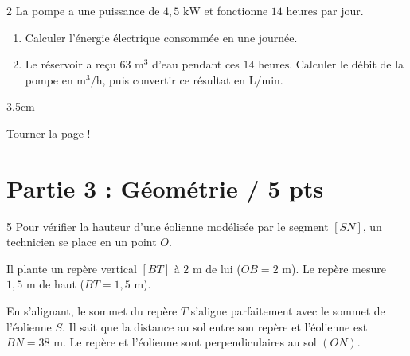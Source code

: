 \documentclass[a4paper]{book}
\begin{document}
{\begin{exerciceNote}{2}
        La pompe a une puissance de $4,5\text{ kW}$ et fonctionne $14\text{ heures}$ par jour.
        \begin{enumerate}
            \item Calculer l'énergie électrique consommée en une journée.
            \item Le réservoir a reçu $63\text{ m}^3$ d'eau pendant ces $14\text{ heures}$. Calculer le débit de la pompe en $\text{m}^3/\text{h}$, puis convertir ce résultat en $\text{L/min}$.
        \end{enumerate}
        \begin{ZoneReponse}{3.5cm}
        \end{ZoneReponse}
    \end{exerciceNote}
    

\vfill
\hfill Tourner la page !
\newpage

\section*{Partie 3 : Géométrie \points[2]/ 5 pts }

    \begin{exerciceNote}{5}
        Pour vérifier la hauteur d'une éolienne modélisée par le segment $[SN]$, un technicien se place en un point $O$. 
        
        Il plante un repère vertical $[BT]$ à $2\text{ m}$ de lui ($OB = 2\text{ m}$). Le repère mesure $1,5\text{ m}$ de haut ($BT = 1,5\text{ m}$).
        
        En s'alignant, le sommet du repère $T$ s'aligne parfaitement avec le sommet de l'éolienne $S$. Il sait que la distance au sol entre son repère et l'éolienne est $BN = 38\text{ m}$.
        Le repère et l'éolienne sont perpendiculaires au sol $(ON)$.
        
        \medskip
        \begin{center}
\end{center}
\end{exerciceNote}}
\end{document}
